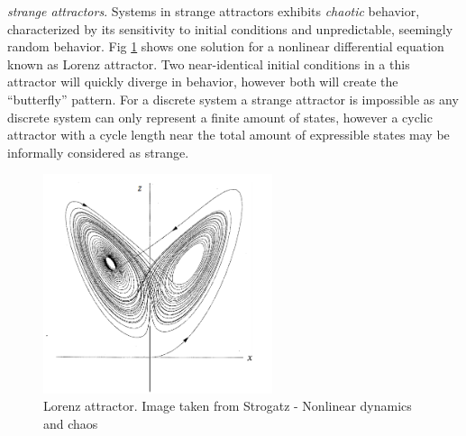 \emph{strange attractors}.
Systems in strange attractors exhibits \emph{chaotic} behavior, characterized by
its sensitivity to initial conditions and unpredictable, seemingly random
behavior.
Fig \ref{figStrange} shows one solution for a nonlinear differential equation known
as Lorenz attractor.
Two near-identical initial conditions in a this attractor will quickly diverge in
behavior, however both will create the ``butterfly'' pattern.
For a discrete system a strange attractor is impossible as any discrete system
can only represent a finite amount of states, however a cyclic attractor with a
cycle length near the total amount of expressible states may be informally
considered as strange.
% 
\begin{figure}[h!]
  \centering
  \includegraphics[width=0.6\textwidth]{fig/strange.png}
  \caption{Lorenz attractor. Image taken from Strogatz - Nonlinear dynamics and chaos}
  \label{figStrange}
\end{figure}
%
